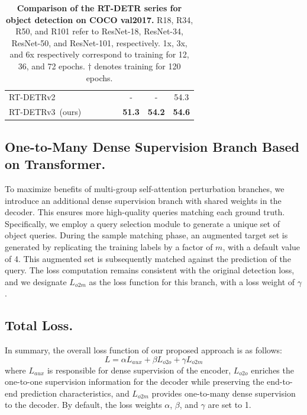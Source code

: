 \documentclass[10pt,twocolumn,letterpaper]{article}
\begin{document}
\begin{table}[]
\begin{tabular}{l|c|c|c|c|ccc}
RT-DETRv2~\cite{lv2024rt-detrv2}         &        &          &     &        & -             & -             & 54.3          \\
\rowcolor[HTML]{ECF4FF} RT-DETRv3~(ours) &          &             &        &           & \textbf{51.3} & \textbf{54.2} & \textbf{54.6} \\ \hline
\end{tabular}
\caption{\textbf{Comparison of the RT-DETR series for object detection on COCO val2017.} R18, R34, R50, and R101 refer to ResNet-18, ResNet-34, ResNet-50, and ResNet-101, respectively. 1x, 3x, and 6x respectively correspond to training for 12, 36, and 72 epochs. $\dagger$ denotes training for 120 epochs.}

\label{speed_transformer}
\end{table}

\subsection{One-to-Many Dense Supervision Branch Based on Transformer.}

To maximize benefits of multi-group self-attention perturbation branches, we introduce an additional dense supervision branch with shared weights in the decoder. This ensures more high-quality queries matching each ground truth. Specifically, we employ a query selection module to generate a unique set of object queries.
During the sample matching phase, an augmented target set is generated by replicating the training labels by a factor of $m$, with a default value of 4. This augmented set is subsequently matched against the prediction of the query. The loss computation remains consistent with the original detection loss, and we designate $L_{o2m}$ as the loss function for this branch, with a loss weight of $\gamma$.

\subsection{Total Loss.}
In summary, the overall loss function of our proposed approach is as follows: 
\begin{equation}
    L = \alpha L_{aux} + \beta L_{o2o} + \gamma L_{o2m}
\end{equation}
where $L_{aux}$ is responsible for dense supervision of the encoder, $L_{o2o}$ enriches the one-to-one supervision information for the decoder while preserving the end-to-end prediction characteristics, and $L_{o2m}$ provides one-to-many dense supervision to the decoder. By default, the loss weights $\alpha$, $\beta$, and $\gamma$ are set to 1.
\end{document}
